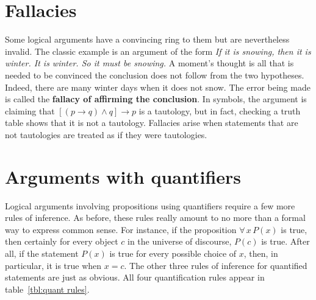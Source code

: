 \section{Fallacies}
Some logical arguments have a convincing ring to them but are nevertheless
invalid. The classic example is an argument of the form {\itshape If it is snowing,
then it is winter. It is winter. So it must be snowing.} A moment's 
thought
is all that is needed to be convinced  the conclusion does not follow from the two
hypotheses. Indeed, there are many winter days when it does not snow. The error
being made is called the {\bfseries fallacy of affirming the conclusion}. In 
symbols,
the argument is claiming that $[(p\to{q}) \land{q}]\to p$ is a tautology, but in
fact, checking a truth table shows that it is not a tautology. Fallacies arise
when statements that are not tautologies are treated as if they were
tautologies.


\section{Arguments with quantifiers}
Logical arguments involving propositions using quantifiers require a few
more rules of inference. As before, these rules really amount to no more than a
formal way to express common sense. For instance, if the proposition
$\forall\,x\,P(x)$ is true, then certainly for every object $c$ in the
universe of discourse, $P(c)$ is true. After all, if the statement $P(x)$ is true
for every possible choice of $x$, then, in particular, it is true when $x=c$. The
other three rules of inference for quantified statements are just as obvious.  
All four quantification rules appear in table~\ref{tbl:quant rules}.


\begin{table}
 \caption{Quantification rules}\label{tbl:quant rules}
\end{table}


